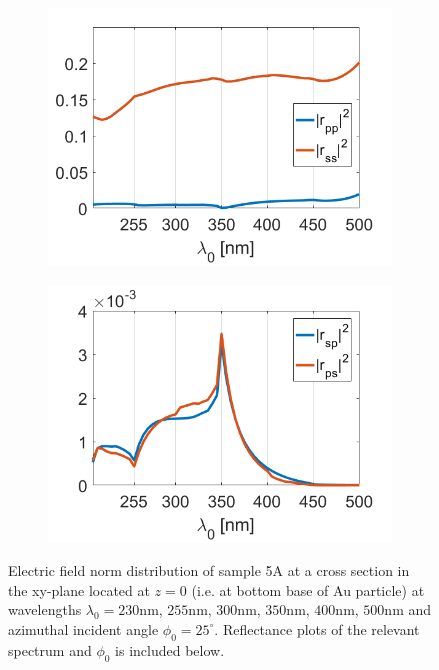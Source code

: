 \begin{figure}[htb!]
   \begin{subfigure}{0.5\textwidth}
        \centering
        \includegraphics[scale=0.28]{figures/ch4/S5A/FieldDistribution/phi25/S5A_rpp_rss_phi25.png}
    \end{subfigure}
    \begin{subfigure}{0.5\textwidth}
        \centering
        \includegraphics[scale=0.28]{figures/ch4/S5A/FieldDistribution/phi25/S5A_rsp_rps_phi25.png}
    \end{subfigure}
   \caption{Electric field norm distribution of sample 5A at a cross section in the xy-plane located at $z=0$ (i.e. at bottom base of Au particle) at wavelengths $\lambda_0=230$nm, $255$nm, $300$nm, $350$nm, $400$nm, $500$nm and azimuthal incident angle $\phi_0=25^\circ$. Reflectance plots of the relevant spectrum and $\phi_0$ is included below.}
   \label{fig:S5A_normE_phi25_z=0}   
\end{figure}



